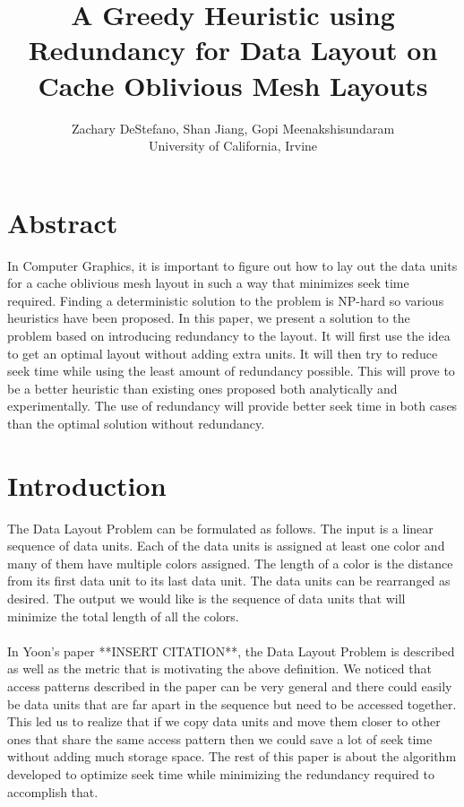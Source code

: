 \documentclass[11pt,psfig]{article}
\begin{document}
\setlength{\parskip}{1.2ex plus0.3ex minus 0.3ex}


\thispagestyle{empty} \pagestyle{myheadings} 



\title{A Greedy Heuristic using Redundancy for Data Layout on Cache Oblivious Mesh Layouts}
\author{Zachary DeStefano, Shan Jiang, Gopi Meenakshisundaram\\ University of California, Irvine}

\maketitle

\vfill\eject

\section*{Abstract}

In Computer Graphics, it is important to figure out how to lay out the data units for a cache oblivious mesh layout in such a way that minimizes seek time required. Finding a deterministic solution to the problem is NP-hard so various heuristics have been proposed. In this paper, we present a solution to the problem based on introducing redundancy to the layout. It will first use the idea to get an optimal layout without adding extra units. It will then try to reduce seek time while using the least amount of redundancy possible. This will prove to be a better heuristic than existing ones proposed both analytically and experimentally. The use of redundancy will provide better seek time in both cases than the optimal solution without redundancy.  

\section*{Introduction}

The Data Layout Problem can be formulated as follows. The input is a linear sequence of data units. Each of the data units is assigned at least one color and many of them have multiple colors assigned. The length of a color is the distance from its first data unit to its last data unit. The data units can be rearranged as desired. The output we would like is the sequence of data units that will minimize the total length of all the colors. \\
\\
In Yoon's paper **INSERT CITATION**, the Data Layout Problem is described as well as the metric that is motivating the above definition. We noticed that access patterns described in the paper can be very general and there could easily be data units that are far apart in the sequence but need to be accessed together. This led us to realize that if we copy data units and move them closer to other ones that share the same access pattern then we could save a lot of seek time without adding much storage space. The rest of this paper is about the algorithm developed to optimize seek time while minimizing the redundancy required to accomplish that. \\
\\
\end{document}
